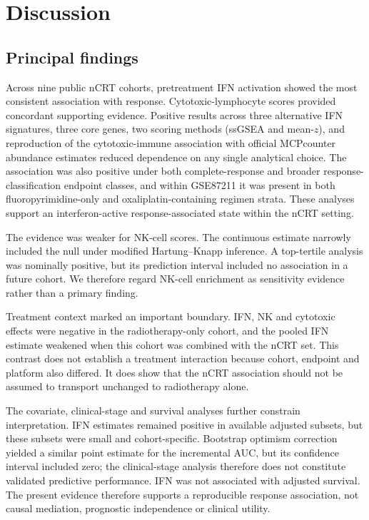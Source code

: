 \documentclass[11pt,a4paper]{article}
\begin{document}
\section{Discussion}

\subsection{Principal findings}

Across nine public nCRT cohorts, pretreatment IFN activation showed the most consistent association with response. Cytotoxic-lymphocyte scores provided concordant supporting evidence. Positive results across three alternative IFN signatures, three core genes, two scoring methods (ssGSEA and mean-$z$), and reproduction of the cytotoxic-immune association with official MCPcounter abundance estimates reduced dependence on any single analytical choice. The association was also positive under both complete-response and broader response-classification endpoint classes, and within GSE87211 it was present in both fluoropyrimidine-only and oxaliplatin-containing regimen strata. These analyses support an interferon-active response-associated state within the nCRT setting.

The evidence was weaker for NK-cell scores. The continuous estimate narrowly included the null under modified Hartung--Knapp inference. A top-tertile analysis was nominally positive, but its prediction interval included no association in a future cohort. We therefore regard NK-cell enrichment as sensitivity evidence rather than a primary finding.

Treatment context marked an important boundary. IFN, NK and cytotoxic effects were negative in the radiotherapy-only cohort, and the pooled IFN estimate weakened when this cohort was combined with the nCRT set. This contrast does not establish a treatment interaction because cohort, endpoint and platform also differed. It does show that the nCRT association should not be assumed to transport unchanged to radiotherapy alone.

The covariate, clinical-stage and survival analyses further constrain interpretation. IFN estimates remained positive in available adjusted subsets, but these subsets were small and cohort-specific. Bootstrap optimism correction yielded a similar point estimate for the incremental AUC, but its confidence interval included zero; the clinical-stage analysis therefore does not constitute validated predictive performance. IFN was not associated with adjusted survival. The present evidence therefore supports a reproducible response association, not causal mediation, prognostic independence or clinical utility.
\end{document}
